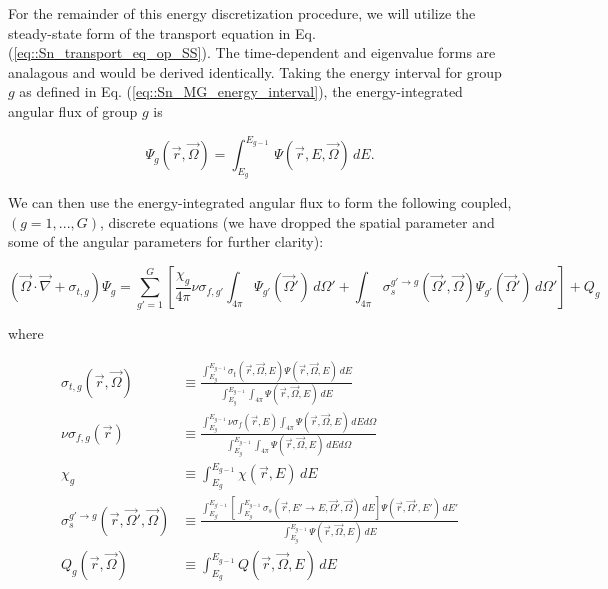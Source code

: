 For the remainder of this energy discretization procedure, we will utilize the steady-state form of the transport equation in Eq. (\ref{eq::Sn_transport_eq_op_SS}). The time-dependent and eigenvalue forms are analagous and would be derived identically. Taking the energy interval for group $g$ as defined in Eq. (\ref{eq::Sn_MG_energy_interval}), the energy-integrated angular flux of group $g$ is

\begin{equation}
\label{eq::Sn_MG_ang_flux_g}
\Psi_g (\vec{r}, \vec{\Omega}) = \int_{E_g}^{E_{g-1}} \, \Psi (\vec{r}, E, \vec{\Omega}) \, dE .
\end{equation}

\noindent We can then use the energy-integrated angular flux to form the following coupled, $(g=1,...,G)$, discrete equations (we have dropped the spatial parameter and some of the angular parameters for further clarity):

\begin{equation}
\label{eq::Sn_MG_trans_eq}
\left(  \vec{\Omega} \cdot \vec{\nabla} + \sigma_{t,g}  \right) \Psi_g =  \sum_{g'=1}^{G} \left[ \frac{\chi_g}{4 \pi} \nu \sigma_{f,g'} \int_{4 \pi} \Psi_{g'} (\vec{\Omega}') \, d\Omega' + \int_{4 \pi} \sigma_{s}^{g' \rightarrow g} (\vec{\Omega}' , \vec{\Omega} ) \Psi_{g'} (\vec{\Omega}')  \, d\Omega'  \right] + Q_g
\end{equation}

\noindent where

\begin{equation}
\label{eq::Sn_MG_exact_condensed_terms}
\begin{aligned}
\sigma_{t,g} (\vec{r},\vec{\Omega}) & \equiv \frac{\int_{E_{g}}^{E_{g-1}} \sigma_{t} (\vec{r},\vec{\Omega},E) \Psi (\vec{r},\vec{\Omega}, E) \, dE}{\int_{E_{g}}^{E_{g-1}} \int_{4 \pi} \Psi (\vec{r},\vec{\Omega}, E) \, dE}\\
\nu\sigma_{f,g} (\vec{r}) & \equiv \frac{\int_{E_{g}}^{E_{g-1}} \nu\sigma_{f} (\vec{r},E)  \int_{4 \pi} \Psi (\vec{r},\vec{\Omega}, E) \, dE d\Omega}{\int_{E_{g}}^{E_{g-1}} \int_{4 \pi} \Psi (\vec{r},\vec{\Omega}, E) \, dE d\Omega} \\
\chi_g & \equiv \int_{E_{g}}^{E_{g-1}} \chi  (\vec{r},E) \, dE \\
\sigma_{s}^{g' \rightarrow g} (\vec{r},\vec{\Omega}' , \vec{\Omega} ) & \equiv \frac{\int_{E_{g'}}^{E_{g'-1}} \left[ \int_{E_{g}}^{E_{g-1}} \sigma_s (\vec{r},E' \rightarrow E,\vec{\Omega}' , \vec{\Omega} ) \, dE \right] \Psi (\vec{r},\vec{\Omega}', E') \, dE' }{\int_{E_{g}}^{E_{g-1}}  \Psi (\vec{r},\vec{\Omega}, E) \, dE} \\
Q_g (\vec{r}, \vec{\Omega}) & \equiv \int_{E_{g}}^{E_{g-1}} Q (\vec{r}, \vec{\Omega}, E) \, dE
\end{aligned}
\end{equation}

